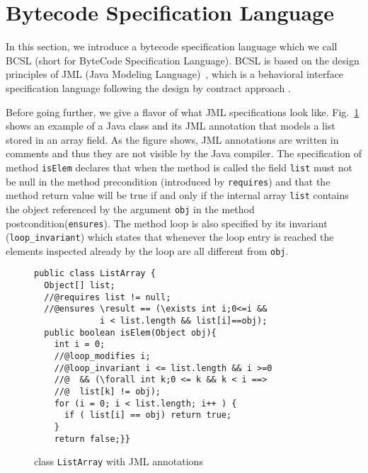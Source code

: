 
\section{Bytecode Specification Language}\label{bcSpecLg}

In this section, we introduce a bytecode specification language which we call BCSL (short for ByteCode Specification Language).
 BCSL is based on the design principles of JML (Java Modeling Language)~\cite{JMLRefMan}, which is a behavioral interface specification 
language following the design by contract approach \cite{M97oos}.


Before going further, we give a flavor of what JML specifications look like. Fig.~\ref{replaceSrc} shows an example of a Java class and its 
JML annotation that models a list stored in an array field. 
As the figure shows, JML annotations are written in comments and thus they are not visible by the Java compiler.
The specification of method \verb!isElem! declares
 that when the method is called the field \verb!list! must not be null in the method precondition (introduced by \verb!requires!) 
and that the method return value will be true if and only if the internal array 
\verb!list! contains the object referenced by the argument \verb!obj! in the method postcondition(\verb!ensures!). The method loop is also specified by
its invariant (\verb!loop_invariant!) which states that whenever the loop entry is reached the elements inspected already by the loop are all different from \verb!obj!.


\begin{figure}[t]

\begin{frameit}
\small{
\begin{verbatim}
public class ListArray {
  Object[] list;
  //@requires list != null;
  //@ensures \result == (\exists int i;0<=i && 
             i < list.length && list[i]==obj); 
  public boolean isElem(Object obj){
    int i = 0;
    //@loop_modifies i;
    //@loop_invariant i <= list.length && i >=0 
    //@  && (\forall int k;0 <= k && k < i ==> 
    //@  list[k] != obj); 
    for (i = 0; i < list.length; i++ ) {
      if ( list[i] == obj) return true; 
    }
    return false;}}
\end{verbatim}
}
\end{frameit}
\caption{\sc class \texttt{ListArray} with JML annotations} 
\label{replaceSrc}
\end{figure}


